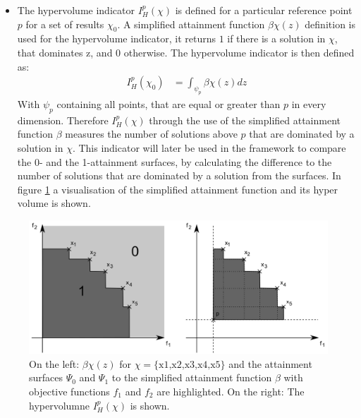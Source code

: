 \documentclass[12pt,twoside]{article}
\theoremstyle{plain}
\theoremstyle{definition}
\theoremstyle{remark}
\begin{document}
\begin{itemize}
	\item The hypervolume indicator $I^p_H(\chi)$ is defined for a particular reference point $p$ for a set of results $\chi_0$. A simplified attainment function $\beta\chi(z)$ definition is used for the hypervolume indicator, it returns $1$ if there is a solution in $\chi$, that dominates z, and $0$ otherwise. The hypervolume indicator is then defined as:
	\begin{align*}
		I^p_H(\chi_0) &= \int_{\psi_p}\beta\chi(z) dz
	\end{align*}
	With $\psi_p$ containing all points, that are equal or greater than $p$ in every dimension.
	Therefore $I^p_H(\chi)$ through the use of the simplified attainment function $\beta$ measures the number of solutions above $p$ that are dominated by a solution in $\chi$.
	This indicator will later be used in the framework to compare the 0- and the 1-attainment surfaces, by calculating the difference to the number of solutions that are dominated by a solution from the surfaces.
	In figure \ref{fig:attainment} a visualisation of the simplified attainment function and its hyper volume is shown.
\end{itemize}
 \addtocounter{footnote}{-1}
 \begin{figure}[h]
 	\begin{center}
 		\vspace*{-0.8cm}
 		\includegraphics[width=1\textwidth]{Bilder/attainment.png}
 	\end{center}
 	\vspace*{-1cm}
 	\caption[On the left: $\beta\chi(z)$ for $\chi = \text{\{x1,x2,x3,x4,x5\}}$ and the attainment surfaces $\Psi_0$ and $\Psi_1$ to the simplified attainment function $\beta$ with objective functions $f_1$ and $f_2$ are highlighted. On the right: The hypervolumne $I^p_H(\chi)$ is shown.]{On the left: $\beta\chi(z)$ for $\chi = \text{\{x1,x2,x3,x4,x5\}}$ and the attainment surfaces $\Psi_0$ and $\Psi_1$ to the simplified attainment function $\beta$ with objective functions $f_1$ and $f_2$ are highlighted. On the right: The hypervolumne $I^p_H(\chi)$ is shown. \footnotemark}
 	\label{fig:attainment}
 \end{figure}
\end{document}
